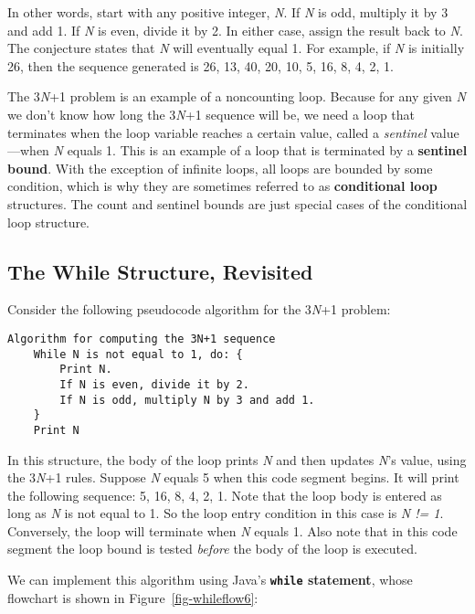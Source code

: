 \noindent In other words, start with any positive integer, {\it N}. If {\it N} 
is odd, multiply it by 3 and add 1.  If {\it N} is even, divide it by
2. In either case, assign the result back to {\it N}. The conjecture
states that {\it N} will eventually equal 1. For example, if {\it N}
is initially 26, then the sequence generated is 26, 13, 40, 20, 10, 5,
16, 8, 4, 2, 1.

The 3{\it N}+1 problem is an example of a noncounting loop. Because for any
given {\it N} we don't know how long the 3{\it N}+1 sequence will be,
we need a loop that terminates when the loop variable reaches a
certain value, called a {\it sentinel} value---when {\it N} equals
1. This is an example of a loop that is terminated by a {\bf sentinel
bound}.  With the exception of infinite loops, all loops are bounded
by some condition, which is why they are sometimes referred to as {\bf
conditional loop} structures.  The count and sentinel bounds are just
special cases of the conditional loop structure.

\subsection{The While Structure, Revisited}
\noindent Consider the following pseudocode algorithm for the 3{\it N}+1 problem:

\begin{jjjlisting}
\begin{lstlisting}
Algorithm for computing the 3N+1 sequence
    While N is not equal to 1, do: {
        Print N.
        If N is even, divide it by 2.
        If N is odd, multiply N by 3 and add 1.
    }
    Print N
\end{lstlisting}
\end{jjjlisting}

\noindent In this structure, the body of the loop prints {\it N} and
then updates {\it N}'s value, using the 3{\it N}+1 rules.  Suppose
{\it N} equals 5 when this code segment begins.  It will print the
following sequence: 5, 16, 8, 4, 2, 1. Note that the loop body is
entered as long as {\it N} is not equal to 1. So the loop entry
condition in this case is {\it N != 1}. Conversely, the loop will
terminate when {\it N} equals 1. Also note that in this code
segment the loop bound is tested {\it before} the body of the loop
is executed.

We can implement this algorithm using Java's {\bf {\tt while} statement},
whose flowchart is shown in Figure~\ref{fig-whileflow6}:


